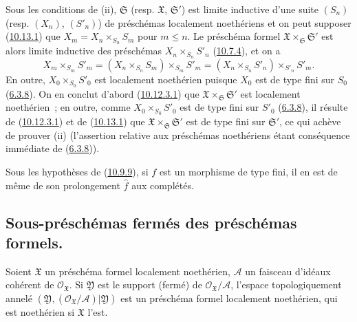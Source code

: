 Sous les conditions de (ii), $\mathfrak{S}$ (resp. $\mathfrak{X}$,
$\mathfrak{S}'$) est limite inductive d'une suite $(S_n)$ (resp. $(X_n)$,
$(S'_n)$) de préschémas localement noethériens et on peut supposer
(\hyperref[I.10.13.1-fr]{10.13.1}) que
$X_m=X_n\times_{S_n}S_m$ pour $m\leq n$. Le préschéma formel
$\mathfrak{X}\times_{\mathfrak{S}}\mathfrak{S}'$ est alors limite inductive
des préschémas $X_n\times_{S_n}S'_n$
(\hyperref[I.10.7.4-fr]{10.7.4}), et on a
\[
  X_m\times_{S_m}S'_m
  =(X_n\times_{S_n}S_m)\times_{S_m}S'_m
  =(X_n\times_{S_n}S'_n)\times_{S'_n}S'_m.
\]
En outre, $X_0\times_{S_0}S'_0$ est localement noethérien puisque $X_0$
est de type fini sur $S_0$ (\hyperref[I.6.3.8-fr]{6.3.8}). On en conclut
d'abord (\hyperref[I.10.12.3.1-fr]{10.12.3.1}) que
$\mathfrak{X}\times_{\mathfrak{S}}\mathfrak{S}'$ est localement
noethérien~; en outre, comme $X_0\times_{S_0}S'_0$ est de type fini sur
$S'_0$ (\hyperref[I.6.3.8-fr]{6.3.8}), il résulte de
(\hyperref[I.10.12.3.1-fr]{10.12.3.1}) et de
(\hyperref[I.10.13.1-fr]{10.13.1}) que
$\mathfrak{X}\times_{\mathfrak{S}}\mathfrak{S}'$ est de type fini sur
$\mathfrak{S}'$, ce qui achève de prouver (ii) (l'assertion relative aux
préschémas noethériens étant conséquence immédiate de
(\hyperref[I.6.3.8-fr]{6.3.8})).

\begin{corollary}[10.13.6]
\label{I.10.13.6-fr}
Sous les hypothèses de (\hyperref[I.10.9.9-fr]{10.9.9}), si $f$ est un
morphisme de type fini, il en est de même de son prolongement $\widehat f$
aux complétés.
\end{corollary}

\subsection{Sous-préschémas fermés des préschémas formels.}
\label{subsection:I.10.14-fr}

\begin{proposition}[10.14.1]
\label{I.10.14.1-fr}
Soient $\mathfrak{X}$ un préschéma formel localement noethérien,
$\mathscr{A}$ un faisceau d'idéaux cohérent de
$\mathscr{O}_{\mathfrak{X}}$. Si $\mathfrak{Y}$ est le support (fermé) de
$\mathscr{O}_{\mathfrak{X}}/\mathscr{A}$, l'espace topologiquement annelé
$(\mathfrak{Y},(\mathscr{O}_{\mathfrak{X}}/\mathscr{A})|\mathfrak{Y})$ est
un préschéma formel localement noethérien, qui est noethérien si
$\mathfrak{X}$ l'est.
\end{proposition}

